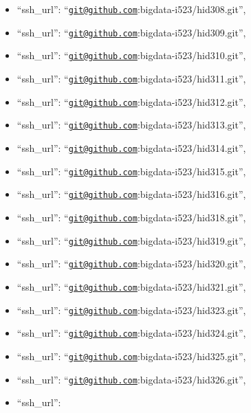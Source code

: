 \begin{itemize}
\item
  ``ssh\_url'':
  ``\href{mailto:git@github.com}{\nolinkurl{git@github.com}}:bigdata-i523/hid308.git'',
\item
  ``ssh\_url'':
  ``\href{mailto:git@github.com}{\nolinkurl{git@github.com}}:bigdata-i523/hid309.git'',
\item
  ``ssh\_url'':
  ``\href{mailto:git@github.com}{\nolinkurl{git@github.com}}:bigdata-i523/hid310.git'',
\item
  ``ssh\_url'':
  ``\href{mailto:git@github.com}{\nolinkurl{git@github.com}}:bigdata-i523/hid311.git'',
\item
  ``ssh\_url'':
  ``\href{mailto:git@github.com}{\nolinkurl{git@github.com}}:bigdata-i523/hid312.git'',
\item
  ``ssh\_url'':
  ``\href{mailto:git@github.com}{\nolinkurl{git@github.com}}:bigdata-i523/hid313.git'',
\item
  ``ssh\_url'':
  ``\href{mailto:git@github.com}{\nolinkurl{git@github.com}}:bigdata-i523/hid314.git'',
\item
  ``ssh\_url'':
  ``\href{mailto:git@github.com}{\nolinkurl{git@github.com}}:bigdata-i523/hid315.git'',
\item
  ``ssh\_url'':
  ``\href{mailto:git@github.com}{\nolinkurl{git@github.com}}:bigdata-i523/hid316.git'',
\item
  ``ssh\_url'':
  ``\href{mailto:git@github.com}{\nolinkurl{git@github.com}}:bigdata-i523/hid318.git'',
\item
  ``ssh\_url'':
  ``\href{mailto:git@github.com}{\nolinkurl{git@github.com}}:bigdata-i523/hid319.git'',
\item
  ``ssh\_url'':
  ``\href{mailto:git@github.com}{\nolinkurl{git@github.com}}:bigdata-i523/hid320.git'',
\item
  ``ssh\_url'':
  ``\href{mailto:git@github.com}{\nolinkurl{git@github.com}}:bigdata-i523/hid321.git'',
\item
  ``ssh\_url'':
  ``\href{mailto:git@github.com}{\nolinkurl{git@github.com}}:bigdata-i523/hid323.git'',
\item
  ``ssh\_url'':
  ``\href{mailto:git@github.com}{\nolinkurl{git@github.com}}:bigdata-i523/hid324.git'',
\item
  ``ssh\_url'':
  ``\href{mailto:git@github.com}{\nolinkurl{git@github.com}}:bigdata-i523/hid325.git'',
\item
  ``ssh\_url'':
  ``\href{mailto:git@github.com}{\nolinkurl{git@github.com}}:bigdata-i523/hid326.git'',
\item
  ``ssh\_url'':

\end{itemize}
